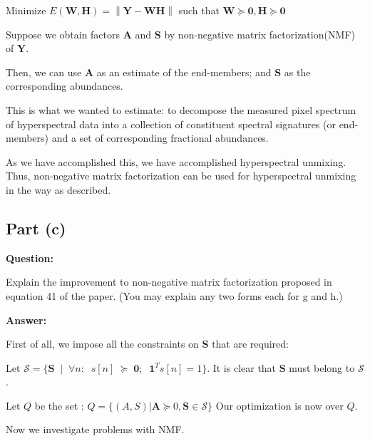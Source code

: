 \documentclass[fleqn, 11pt]{article}
\newcommand{\bs}[1]{\boldsymbol{#1}}
\newcommand\norm[1]{\left\lVert#1\right\rVert}
\begin{document}
\begin{center}
    Minimize $E(\bs{W, H}) = \norm{\bs{Y-WH}}  $ such that $\bs{W} \succeq \bs{0}, \bs{H} \succeq \bs{0} $
\end{center}

Suppose we obtain factors $\bs{A}$
and $\bs{S}$ by non-negative matrix factorization(NMF) of $\bs{Y}$.

\smallskip

Then, we can use  $\bs{A}$ as an estimate of the end-members; and $\bs{S}$ as the corresponding abundances.

\smallskip

This is what we wanted to estimate: to decompose the measured pixel spectrum
of hyperspectral data into a collection of constituent spectral
signatures (or end-members) and a set of corresponding fractional abundances.

\smallskip

As we have accomplished this, we have accomplished hyperspectral unmixing.
Thus, non-negative matrix factorization can be used for hyperspectral
unmixing in the way as described. 


\bigskip


\subsection*{Part (c)}

\textbf{Question: }

\smallskip

Explain the improvement to non-negative matrix factorization proposed in equation 41 of the paper.
(You may explain any two forms each for g and h.)

\hrulefill

\medskip

\textbf{Answer: }

\smallskip

First of all, we impose all the constraints 
on $\bs{S}$ that are required:

Let $\mathcal{S}=\{ \bs{S} \;\; | \;\; \forall n:  \;\; s[n] \; \succeq \; \bs{0} ;  \;\;
\bs{1}^Ts[n]=1    \}$. 
It is clear that $\bs{S}$ must belong 
to $\mathcal{S}$. 

\medskip

Let $Q$ be the set :
$Q = \{ (A,S) |  \bs{A} \succeq {0}, 
\bs{S} \in \mathcal{S}\}$
Our optimization is now over $Q$. 

\medskip

Now we investigate problems with NMF. 
\end{document}
